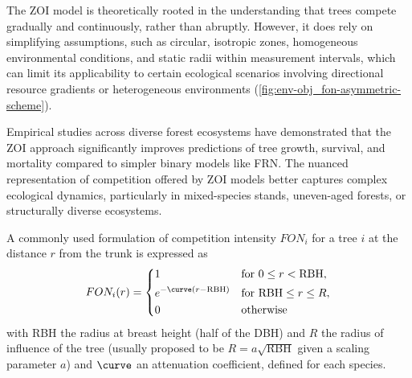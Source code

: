 The ZOI model is theoretically rooted in the understanding that trees compete gradually and continuously, rather than abruptly. However, it does rely on simplifying assumptions, such as circular, isotropic zones, homogeneous environmental conditions, and static radii within measurement intervals, which can limit its applicability to certain ecological scenarios involving directional resource gradients or heterogeneous environments (\cref{fig:env-obj_fon-asymmetric-scheme}).

Empirical studies across diverse forest ecosystems have demonstrated that the ZOI approach significantly improves predictions of tree growth, survival, and mortality compared to simpler binary models like FRN. The nuanced representation of competition offered by ZOI models better captures complex ecological dynamics, particularly in mixed-species stands, uneven-aged forests, or structurally diverse ecosystems.



A commonly used formulation of competition intensity $FON_i$ for a tree $i$ at the distance $r$ from the trunk is expressed as 
\begin{align}
    FON_i(r) = \begin{dcases}
        1 & \text{for } 0 \leq r < \text{RBH}, \\
        e^{-\curve(r - \text{RBH})} & \text{for } \text{RBH} \leq r \leq R, \\
        0 & \text{otherwise}
    \end{dcases}
\end{align}
with RBH the radius at breast height (half of the DBH) and $R$ the radius of influence of the tree (usually proposed to be $R = a \sqrt{\text{RBH}}$ given a scaling parameter $a$) and $\curve$ an attenuation coefficient, defined for each species. 


